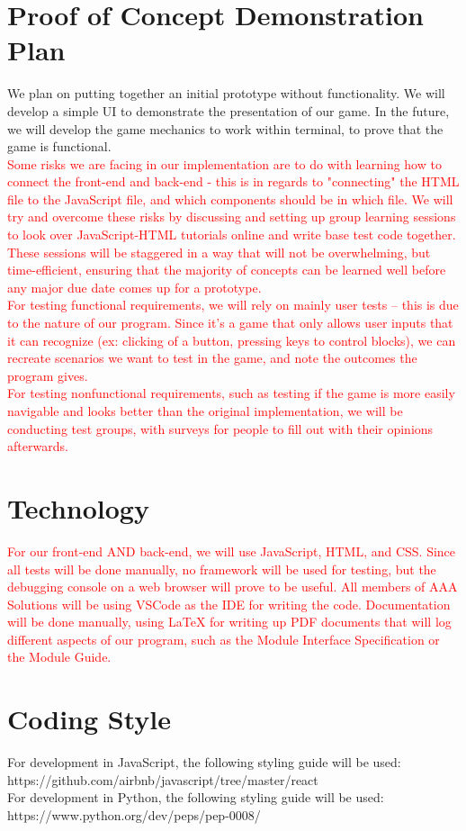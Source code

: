 \documentclass{article}
\begin{document}
\section{Proof of Concept Demonstration Plan}
We plan on putting together an initial prototype without functionality. We will develop a simple UI to demonstrate the presentation of our game. In the future, we will develop the game mechanics to work within terminal, to prove that the game is functional.\\
\textcolor{red}{Some risks we are facing in our implementation are to do with learning how to connect the front-end and back-end - this is in regards to "connecting" the HTML file to the JavaScript file, and which components should be in which file. We will try and overcome these risks by discussing and setting up group learning sessions to look over JavaScript-HTML tutorials online and write base test code together. These sessions will be staggered in a way that will not be overwhelming, but time-efficient, ensuring that the majority of concepts can be learned well before any major due date comes up for a prototype.
\\For testing functional requirements, we will rely on mainly user tests -- this is due to the nature of our program. Since it's a game that only allows user inputs that it can recognize (ex: clicking of a button, pressing keys to control blocks), we can recreate scenarios we want to test in the game, and note the outcomes the program gives.
\\For testing nonfunctional requirements, such as testing if the game is more easily navigable and looks better than the original implementation, we will be conducting test groups, with surveys for people to fill out with their opinions afterwards.
}

\section{Technology}
\textcolor{red}{For our front-end AND back-end, we will use JavaScript, HTML, and CSS. Since all tests will be done manually, no framework will be used for testing, but the debugging console on a web browser will prove to be useful. All members of AAA Solutions will be using VSCode as the IDE for writing the code. Documentation will be done manually, using LaTeX for writing up PDF documents that will log different aspects of our program, such as the Module Interface Specification or the Module Guide.}

\section{Coding Style}
For development in JavaScript, the following styling guide will be used:\\
https://github.com/airbnb/javascript/tree/master/react \\
For development in Python, the following styling guide will be used:\\ 
https://www.python.org/dev/peps/pep-0008/ \\
\end{document}
